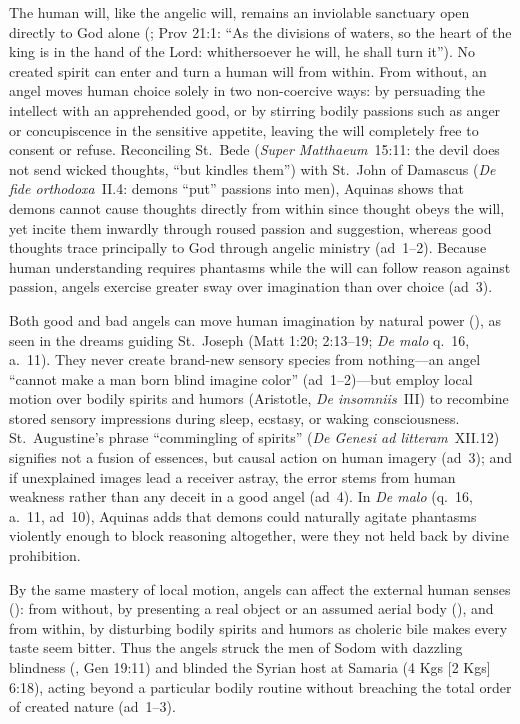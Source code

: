 The human will, like the angelic will, remains an inviolable sanctuary open directly to God alone (; Prov 21:1: ``As the divisions of waters, so the heart of the king is in the hand of the Lord: whithersoever he will, he shall turn it''). No created spirit can enter and turn a human will from within. From without, an angel moves human choice solely in two non-coercive ways: by persuading the intellect with an apprehended good, or by stirring bodily passions such as anger or concupiscence in the sensitive appetite, leaving the will completely free to consent or refuse. Reconciling St.~Bede (\emph{Super Matthaeum}~15:11: the devil does not send wicked thoughts, ``but kindles them'') with St.~John of Damascus (\emph{De fide orthodoxa}~II.4: demons ``put'' passions into men), Aquinas shows that demons cannot cause thoughts directly from within since thought obeys the will, yet incite them inwardly through roused passion and suggestion, whereas good thoughts trace principally to God through angelic ministry (ad~1--2). Because human understanding requires phantasms while the will can follow reason against passion, angels exercise greater sway over imagination than over choice (ad~3).

Both good and bad angels can move human imagination by natural power (), as seen in the dreams guiding St.~Joseph (Matt 1:20; 2:13--19; \emph{De malo} q.~16, a.~11). They never create brand-new sensory species from nothing---an angel ``cannot make a man born blind imagine color'' (ad~1--2)---but employ local motion over bodily spirits and humors (Aristotle, \emph{De insomniis}~III) to recombine stored sensory impressions during sleep, ecstasy, or waking consciousness. St.~Augustine's phrase ``commingling of spirits'' (\emph{De Genesi ad litteram}~XII.12) signifies not a fusion of essences, but causal action on human imagery (ad~3); and if unexplained images lead a receiver astray, the error stems from human weakness rather than any deceit in a good angel (ad~4). In \emph{De malo} (q.~16, a.~11, ad~10), Aquinas adds that demons could naturally agitate phantasms violently enough to block reasoning altogether, were they not held back by divine prohibition.

By the same mastery of local motion, angels can affect the external human senses (): from without, by presenting a real object or an assumed aerial body (), and from within, by disturbing bodily spirits and humors as choleric bile makes every taste seem bitter. Thus the angels struck the men of Sodom with dazzling blindness (, Gen 19:11) and blinded the Syrian host at Samaria (4 Kgs [2 Kgs] 6:18), acting beyond a particular bodily routine without breaching the total order of created nature (ad~1--3).

